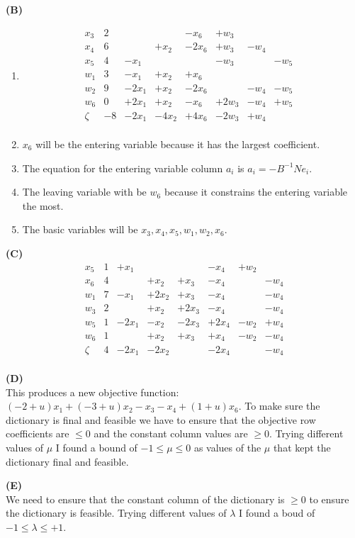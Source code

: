 \documentclass[11pt]{article}
\begin{document}
\noindent\textbf{(B)}

\begin{enumerate}
\item
  \[\begin{array}{r|ccccccccccccc}
  x_3 & 2 & & & -x_6 & +w_3 & & & \\
  x_4 & 6 & & +x_2 & -2x_6 & +w_3 & -w_4 & \\
  x_5 & 4 & -x_1 & & & -w_3 & & -w_5 \\
  w_1 & 3 & -x_1 & +x_2 & +x_6 & & & \\
  w_2 & 9 & -2x_1 & +x_2 & -2x_6 & & -w_4 & -w_5 \\
  w_6 & 0 & +2x_1 & +x_2 & -x_6 & +2w_3 & -w_4 & +w_5 \\
  \hline
  \zeta & -8 & -2x_1 & -4x_2 & +4x_6 & -2w_3 & +w_4 & \\
  \end{array}\]
\item
$x_6$ will be the entering variable because it has the largest coefficient.
\item
  The equation for the entering variable column $a_i$ is $a_i = -B^{-1}Ne_i$.

\item
The leaving variable with be $w_6$ because it constrains the entering variable the most.
\item
The basic variables will be $x_3,x_4,x_5,w_1,w_2,x_6$.
\end{enumerate}

\noindent\textbf{(C)}
\\
\[\begin{array}{r|ccccccccccccc}
x_5 & 1 & +x_1 & & & -x_4 & +w_2 & \\
x_6 & 4 & & +x_2 & +x_3 & -x_4 & & -w_4 \\
w_1 & 7 & -x_1 & +2x_2 & +x_3 & -x_4 & & -w_4 \\
w_3 & 2 & & +x_2 & +2x_3 & -x_4 & & -w_4 \\
w_5 & 1 & -2x_1 & -x_2 & -2x_3 & +2x_4 & -w_2 & +w_4 \\
w_6 & 1 & & +x_2 & +x_3 & +x_4 & -w_2 & -w_4 \\
\hline
\zeta & 4 & -2x_1 & -2x_2 & & -2x_4 & & -w_4 \\
\end{array}\]
\bigskip

\noindent\textbf{(D)}
\\
This produces a new objective function: $(-2+u)x_1 + (-3+u)x_2 -x_3 -x_4 + (1+u)x_6$.  To make sure the dictionary is final and feasible we have to ensure that the objective row coefficients are $\leq 0$ and the constant column values are $\geq 0$.  Trying different values of $\mu$ I found a bound of $-1 \leq \mu \leq 0$ as values of the $\mu$ that kept the dictionary final and feasible.
\bigskip

\noindent\textbf{(E)} 
\\
We need to ensure that the constant column of the dictionary is $\geq 0$ to ensure the dictionary is feasible.  Trying different values of $\lambda$ I found a boud of $-1 \leq \lambda \leq +1$.
\newpage

\end{document}

